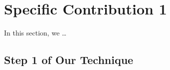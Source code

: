 \documentclass[../techreport.tex]{subfiles}
\begin{document}
\section{Specific Contribution 1}
\label{sec:specific1}
In this section, we \ldots
\subsection{Step 1 of Our Technique}
\lipsum[16]
\end{document}
